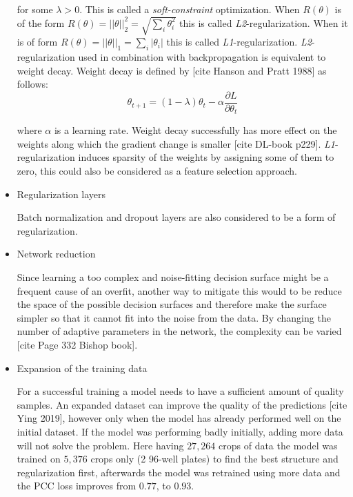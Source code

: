 \begin{itemize}
	for some $\lambda > 0$. This is called a \emph{soft-constraint} optimization. When $R(\theta)$ is of the form $R(\theta) = ||\theta||^2_2 = \sqrt{\sum\limits_i \theta_i^2}$ this is called \emph{L2}-regularization. When it is of form $R(\theta) = ||\theta||_1 = \sum\limits_i |\theta_i|$ this is called \emph{L1}-regularization. \emph{L2}-regularization used in combination with backpropagation is equivalent to weight decay. Weight decay is defined by [cite Hanson and Pratt 1988] as follows:
	\begin{equation}
		\theta_{t+1} = (1 - \lambda)\theta_t - \alpha \frac{\partial L}{\partial \theta_t}
	\end{equation}

	where $\alpha$ is a learning rate. Weight decay successfully has more effect on the weights along which the gradient change is smaller [cite DL-book p229]. \emph{L1}-regularization induces sparsity of the weights by assigning some of them to zero, this could also be considered as a feature selection approach.

	\item Regularization layers

	Batch normalization and dropout layers are also considered to be a form of regularization.

	\item Network reduction

	Since learning a too complex and noise-fitting decision surface might be a frequent cause of an overfit, another way to mitigate this would to be reduce the space of the possible decision surfaces and therefore make the surface simpler so that it cannot fit into the noise from the data. By changing the number of adaptive parameters in the network, the complexity can be varied [cite Page 332 Bishop book].

	\item Expansion of the training data

	For a successful training a model needs to have a sufficient amount of quality samples. An expanded dataset can improve the quality of the predictions [cite Ying 2019], however only when the model has already performed well on the initial dataset. If the model was performing badly initially, adding more data will not solve the problem. Here having $27,264$ crops of data the model was trained on $5,376$ crops only (2 96-well plates) to find the best structure and regularization first, afterwards the model was retrained using more data and the PCC loss improves from $0.77$, to $0.93$.
\end{itemize}
